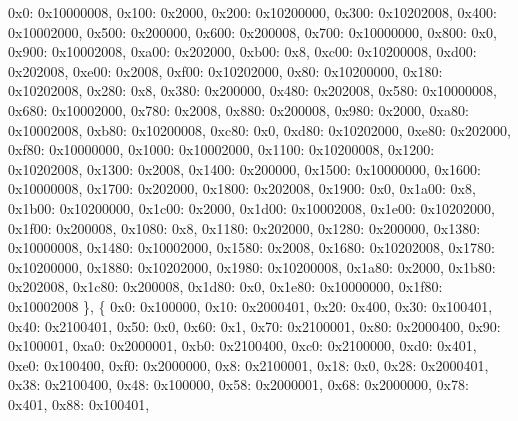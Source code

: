 \begin{DoxyCodeInclude}
            0x0: 0x10000008,
            0x100: 0x2000,
            0x200: 0x10200000,
            0x300: 0x10202008,
            0x400: 0x10002000,
            0x500: 0x200000,
            0x600: 0x200008,
            0x700: 0x10000000,
            0x800: 0x0,
            0x900: 0x10002008,
            0xa00: 0x202000,
            0xb00: 0x8,
            0xc00: 0x10200008,
            0xd00: 0x202008,
            0xe00: 0x2008,
            0xf00: 0x10202000,
            0x80: 0x10200000,
            0x180: 0x10202008,
            0x280: 0x8,
            0x380: 0x200000,
            0x480: 0x202008,
            0x580: 0x10000008,
            0x680: 0x10002000,
            0x780: 0x2008,
            0x880: 0x200008,
            0x980: 0x2000,
            0xa80: 0x10002008,
            0xb80: 0x10200008,
            0xc80: 0x0,
            0xd80: 0x10202000,
            0xe80: 0x202000,
            0xf80: 0x10000000,
            0x1000: 0x10002000,
            0x1100: 0x10200008,
            0x1200: 0x10202008,
            0x1300: 0x2008,
            0x1400: 0x200000,
            0x1500: 0x10000000,
            0x1600: 0x10000008,
            0x1700: 0x202000,
            0x1800: 0x202008,
            0x1900: 0x0,
            0x1a00: 0x8,
            0x1b00: 0x10200000,
            0x1c00: 0x2000,
            0x1d00: 0x10002008,
            0x1e00: 0x10202000,
            0x1f00: 0x200008,
            0x1080: 0x8,
            0x1180: 0x202000,
            0x1280: 0x200000,
            0x1380: 0x10000008,
            0x1480: 0x10002000,
            0x1580: 0x2008,
            0x1680: 0x10202008,
            0x1780: 0x10200000,
            0x1880: 0x10202000,
            0x1980: 0x10200008,
            0x1a80: 0x2000,
            0x1b80: 0x202008,
            0x1c80: 0x200008,
            0x1d80: 0x0,
            0x1e80: 0x10000000,
            0x1f80: 0x10002008
        \},
        \{
            0x0: 0x100000,
            0x10: 0x2000401,
            0x20: 0x400,
            0x30: 0x100401,
            0x40: 0x2100401,
            0x50: 0x0,
            0x60: 0x1,
            0x70: 0x2100001,
            0x80: 0x2000400,
            0x90: 0x100001,
            0xa0: 0x2000001,
            0xb0: 0x2100400,
            0xc0: 0x2100000,
            0xd0: 0x401,
            0xe0: 0x100400,
            0xf0: 0x2000000,
            0x8: 0x2100001,
            0x18: 0x0,
            0x28: 0x2000401,
            0x38: 0x2100400,
            0x48: 0x100000,
            0x58: 0x2000001,
            0x68: 0x2000000,
            0x78: 0x401,
            0x88: 0x100401,

\end{DoxyCodeInclude}
